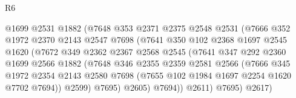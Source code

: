 \begin{lexlean}{R6}
\begin{coremodule}
                                @1699
                                @2531
                                @1882
                                (@7648
                                  @353
                                  @2371
                                  @2375
                                  @2548
                                  @2531
                                  (@7666
                                    @352
                                    @1972
                                    @2370
                                    @2143
                                    @2547
                                    @7698
                                    (@7641
                                      @350
                                      @102
                                      @2368
                                      @1697
                                      @2545
                                      @1620
                                      (@7672
                                        @349
                                        @2362
                                        @2367
                                        @2568
                                        @2545
                                        (@7641
                                          @347
                                          @292
                                          @2360
                                          @1699
                                          @2566
                                          @1882
                                          (@7648
                                            @346
                                            @2355
                                            @2359
                                            @2581
                                            @2566
                                            (@7666
                                              @345
                                              @1972
                                              @2354
                                              @2143
                                              @2580
                                              @7698
                                              (@7655 @102 @1984 @1697 @2254 @1620 @7702 @7694))
                                            @2599)
                                          @7695)
                                        @2605)
                                      @7694))
                                  @2611)
                                @7695)
                              @2617)

\end{coremodule}
\end{lexlean}

